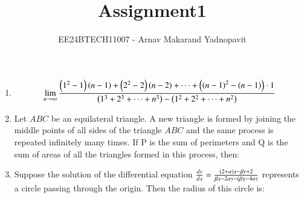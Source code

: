 \documentclass[journal,12pt,onecolumn]{IEEEtran}
\theoremstyle{remark}
\begin{document}
\title{Assignment1}
\author{EE24BTECH11007 - Arnav Makarand Yadnopavit}
\maketitle
\renewcommand{\thefigure}{\theenumi}
\renewcommand{\thetable}{\theenumi}
\begin{enumerate}
\item \[\lim_{n\to\infty}\frac{\left(1^2 -1\right)\left(n-1\right)+\left(2^2 -2\right)\left(n-2\right)+\dots+\left(\left(n-1\right)^2 -\left(n-1\right)\right)\cdot1}{\left(1^3 +2^3 +\dots+n^3\right)-\left(1^2 +2^2 +\dots+n^2\right)}\]
\begin{enumerate}
\end{enumerate}
\item Let $ABC$  be an equilateral triangle. A new triangle is formed by joining the middle points of all sides of the triangle $ABC$ and the same process is repeated infinitely many times. If P is the sum of perimeters and Q is the sum of areas of all the triangles formed in this process, then:
\begin{enumerate}
\end{enumerate}
\item Suppose the solution of the differential equation $\frac{dy}{dx} = \frac{\left(2+\alpha\right)x - \beta y + 2}{\beta x - 2\alpha y - \left(\beta\gamma - 4\alpha\right)}$ represents a circle passing through the origin. Then the radius of this circle is:
\begin{enumerate}
\end{enumerate}

\end{enumerate}
\end{document}
